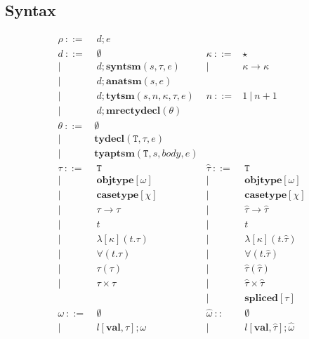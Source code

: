 \documentclass{sig-alternate}
\newcommand{\T}{\mathtt{T}}
\begin{document}
\subsection{Syntax}
\[
\begin{array}{rlrlrl}
  \rho    ~::=&~ {d};e\\        
  {d}   ~::=&~ \emptyset                  & \kappa      ~::=& \star\\
        | ~ &~ {d}; \mathbf{syntsm}(s,\tau,e)     &   | ~ & \kappa\rightarrow\kappa\\
        | ~ &~ {d}; \mathbf{anatsm}(s,e)        \\
        | ~ &~ {d};\mathbf{tytsm}(s,n,\kappa,\tau,e)   & n ~ ::= &1 ~|~ n + 1     \\
        | ~ &~{d};\mathbf{mrectydecl}(\theta)\\
  \theta  ~::=& \emptyset \\
        | ~ & \mathbf{tydecl}(\T,\tau,e)\\
      |~&\mathbf{tyaptsm}(\T,s,body,e)\\
  \tau    ~::=&~ \T       &\hat{\tau} ~::=&~ \T\\
        |~  & ~ \mathbf{objtype}[\omega]    &|~ &~ \mathbf{objtype}[\omega]       \\
        |~  & ~ \mathbf{casetype}[\chi]     &|~ &~ \mathbf{casetype}[\chi]        \\
        |~  & ~ \tau\rightarrow\tau       &|~ &~ \hat\tau\rightarrow\hat\tau  \\
        |~  & ~ t               &|~ &~ t                  \\
        |~  & ~ \lambda[\kappa](t.\tau)     &|~ &~ \lambda[\kappa](t.\hat{\tau})\\
        |~  & ~ \forall(t.\tau)       &|~ &~ \forall(t.\hat{\tau})\\
        |~  & ~ \tau(\tau)            &|~ &~ \hat{\tau}(\hat{\tau})\\
        |~  & ~ \tau \times \tau        &|~ &~ \hat{\tau}\times\hat{\tau}\\
            &                 &|~ &~ \mathbf{spliced}[\tau]\\
  \omega ~::=&~   \emptyset             &\hat{\omega} ~::&~ \emptyset\\
   |~&    ~l[\mathbf{val}, \tau];\omega       &|~ & ~l[\mathbf{val}, \hat\tau];\hat\omega \\

\end{array}\]
\end{document}
